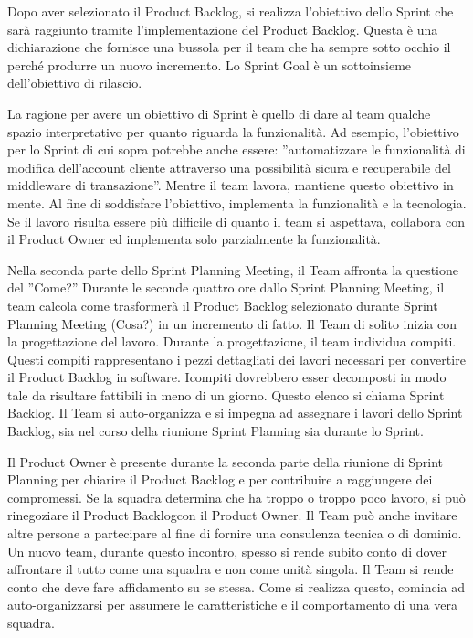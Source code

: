 Dopo aver selezionato il Product Backlog, si realizza l'obiettivo dello Sprint che sar\`a raggiunto tramite
l'implementazione del Product Backlog. Questa \`e una dichiarazione che fornisce una bussola per il team che ha sempre
sotto occhio il perch\'e produrre un nuovo incremento. Lo Sprint Goal \`e un sottoinsieme dell'obiettivo di rilascio.
\newline

La ragione per avere un obiettivo di Sprint \`e quello di dare al team qualche spazio interpretativo per quanto
riguarda la funzionalit\`a. Ad esempio, l'obiettivo per lo Sprint di cui sopra potrebbe anche essere: ''automatizzare
le funzionalit\`a di modifica dell'account cliente attraverso una possibilit\`a sicura e recuperabile del middleware di
transazione''. Mentre il team lavora, mantiene questo obiettivo in mente. Al fine di soddisfare l'obiettivo, implementa
la funzionalit\`a e la tecnologia. Se il lavoro risulta essere pi\`u difficile di quanto il team si aspettava,
collabora con il Product Owner ed implementa solo parzialmente la funzionalit\`a. 
\newline

Nella seconda parte dello Sprint Planning Meeting, il Team affronta la questione del ''Come?'' Durante le seconde
quattro ore dallo Sprint Planning Meeting, il team calcola come trasformer\`a il Product Backlog selezionato durante
Sprint Planning Meeting (Cosa?) in un incremento di fatto. Il Team di solito inizia con la progettazione del lavoro.
Durante la progettazione, il team individua compiti. Questi compiti rappresentano i pezzi dettagliati dei lavori
necessari per convertire il Product Backlog in software. Icompiti dovrebbero esser decomposti in modo tale da risultare
fattibili in meno di un giorno. Questo elenco si chiama Sprint Backlog. Il Team si auto-organizza e si impegna ad
assegnare i lavori dello Sprint Backlog, sia nel corso della riunione Sprint Planning sia durante lo Sprint. 
\newline

Il Product Owner \`e presente durante la seconda parte della riunione di Sprint Planning per chiarire il Product
Backlog e per contribuire a raggiungere dei compromessi. Se la squadra determina che ha troppo o troppo poco lavoro, si
pu\`o rinegoziare il Product Backlogcon il Product Owner. Il Team pu\`o anche invitare altre persone a partecipare al
fine di fornire una consulenza tecnica o di dominio. Un nuovo team, durante questo incontro, spesso si rende subito
conto di dover affrontare il tutto come una squadra e non come unit\`a singola. Il Team si rende conto che deve fare
affidamento su se stessa. Come si realizza questo, comincia ad auto-organizzarsi per assumere le caratteristiche e il
comportamento di una vera squadra.

